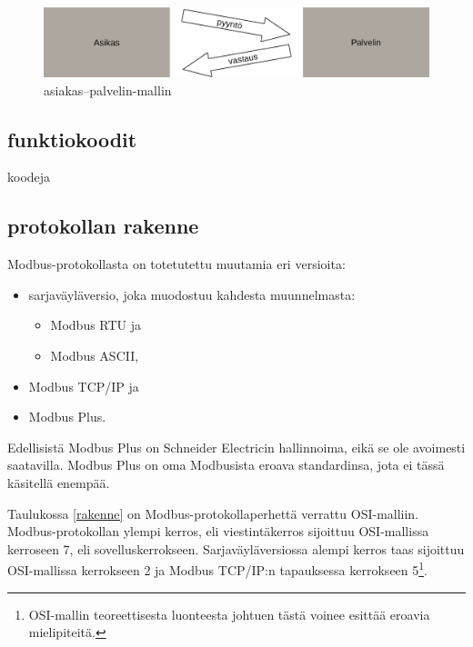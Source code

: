   \begin{figure}
    \centering
    \includegraphics[width=1\textwidth]{figures/client_server}
    \caption{asiakas--palvelin-mallin}
    \label{fig:c_s}
  \end{figure}

  \subsection{funktiokoodit}
   koodeja

  \subsection{protokollan rakenne}

    Modbus-protokollasta on totetutettu muutamia eri versioita:
    \begin{itemize}
      \item sarjaväyläversio, joka muodostuu kahdesta muunnelmasta:
      \begin{itemize}
        \item Modbus RTU ja
        \item Modbus ASCII,
      \end{itemize}
      \item Modbus TCP/IP ja
      \item Modbus Plus.
      \parencite{modbusAppSpec}
    \end{itemize}
    Edellisistä Modbus Plus on Schneider Electricin hallinnoima, eikä se ole avoimesti saatavilla. Modbus Plus on oma Modbusista eroava standardinsa, jota ei tässä käsitellä enempää.\parencite{seCom}

    Taulukossa \ref{rakenne} on Modbus-protokollaperhettä verrattu \gls{OSI}-malliin. Modbus-protokollan ylempi kerros, eli viestintäkerros sijoittuu \gls{OSI}-mallissa kerroseen 7, eli sovelluskerrokseen. Sarjaväyläversiossa alempi kerros taas sijoittuu \gls{OSI}-mallissa kerrokseen 2 ja Modbus TCP/IP:n tapauksessa kerrokseen 5\footnote{\gls{OSI}-mallin teoreettisesta luonteesta johtuen tästä voinee esittää eroavia mielipiteitä.}.


